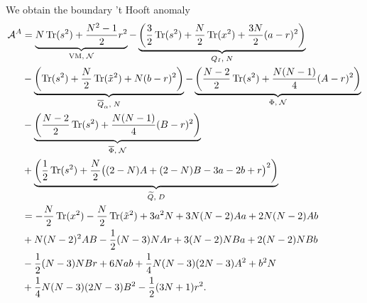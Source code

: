 \documentclass[12pt]{article}
\newcommand{\Acal}{\mathcal{A}}
\newcommand{\Ncal}{\mathcal{N}}
\DeclareMathOperator*{\Tr}{{\rm Tr}}
\numberwithin{equation}{section}
\begin{document}
We obtain the boundary 't Hooft anomaly 
\begin{align}
\label{bdy_SUN_2AS_3_3_anomA}
\Acal^A & = \underbrace{N\Tr(s^2) + \frac{N^2 - 1}{2}r^2}_{\textrm{VM}, \; \Ncal}
 - \underbrace{\left( \frac{3}{2}\Tr(s^2) + \frac{N}{2}\Tr(x^2) + \frac{3N}{2}(a-r)^2 \right)}_{Q_I, \; N}
  \nonumber \\
 & - \underbrace{\left( \Tr(s^2) + \frac{N}{2}\Tr(\tilde{x}^2) + N(b-r)^2 \right)}_{\overline{Q}_{\alpha}, \; N}
 - \underbrace{\left( \frac{N-2}{2}\Tr(s^2) + \frac{N(N-1)}{4}(A - r)^2 \right)}_{\Phi, \; \Ncal}
  \nonumber \\
 & - \underbrace{\left( \frac{N-2}{2}\Tr(s^2) + \frac{N(N-1)}{4}(B - r)^2 \right)}_{\overline{\Phi}, \; \Ncal}
 \nonumber \\
 & + \underbrace{\left( \frac{1}{2}\Tr(s^2) + \frac{N}{2}\big( (2 - N)A + (2 - N)B - 3a - 2b + r \big)^2 \right)}_{\widetilde{Q}, \; D}
   \nonumber \\
  &= - \frac{N}{2} \Tr(x^2) - \frac{N}{2} \Tr(\tilde{x}^2) +
  3 a^2 N + 3N (N-2) Aa + 2 N (N-2) Ab
  \nonumber \\ 
  & + N (N-2)^2 AB - \frac{1}{2} (N-3) N Ar + 3 (N-2) N Ba + 2 (N-2) N Bb
  \nonumber \\
  & - \frac{1}{2} (N-3) N Br + 6N a b + \frac{1}{4} N (N-3) (2N-3) A^2 + b^2 N
  \nonumber \\
  & + \frac{1}{4} N (N-3) (2N-3) B^2 - \frac{1}{2} (3N + 1) r^2. 
\end{align}
\end{document}

